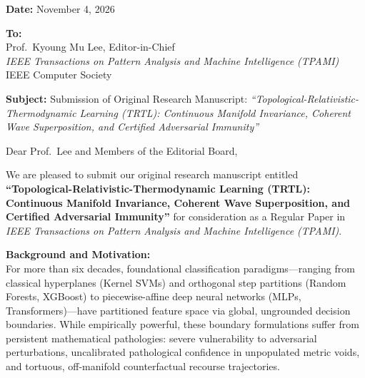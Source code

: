 \documentclass[11pt]{article}
\begin{document}
\pagestyle{empty}

\begin{flushright}
\textbf{Date:} November 4, 2026
\end{flushright}

\vspace{0.2cm}
\noindent
\textbf{To:} \\
Prof.~Kyoung Mu Lee, Editor-in-Chief \\
\textit{IEEE Transactions on Pattern Analysis and Machine Intelligence (TPAMI)} \\
IEEE Computer Society

\vspace{0.4cm}
\noindent
\textbf{Subject:} Submission of Original Research Manuscript: \textit{``Topological-Relativistic-Thermodynamic Learning (TRTL): Continuous Manifold Invariance, Coherent Wave Superposition, and Certified Adversarial Immunity''}

\vspace{0.4cm}
\noindent
Dear Prof.~Lee and Members of the Editorial Board,

\vspace{0.2cm}
We are pleased to submit our original research manuscript entitled \textbf{``Topological-Relativistic-Thermodynamic Learning (TRTL): Continuous Manifold Invariance, Coherent Wave Superposition, and Certified Adversarial Immunity''} for consideration as a Regular Paper in \textit{IEEE Transactions on Pattern Analysis and Machine Intelligence (TPAMI)}.

\vspace{0.2cm}
\noindent
\textbf{Background and Motivation:} \\
For more than six decades, foundational classification paradigms---ranging from classical hyperplanes (Kernel SVMs) and orthogonal step partitions (Random Forests, XGBoost) to piecewise-affine deep neural networks (MLPs, Transformers)---have partitioned feature space via global, ungrounded decision boundaries. While empirically powerful, these boundary formulations suffer from persistent mathematical pathologies: severe vulnerability to adversarial perturbations, uncalibrated pathological confidence in unpopulated metric voids, and tortuous, off-manifold counterfactual recourse trajectories.
\end{document}
